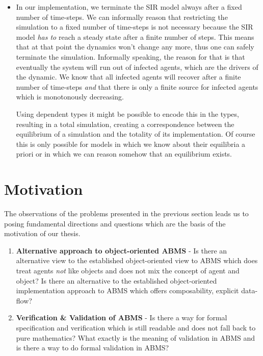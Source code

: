 \begin{itemize}
	\item In our implementation, we terminate the SIR model always after a fixed number of time-steps. We can informally reason that restricting the simulation to a fixed number of time-steps is not necessary because the SIR model \textit{has to} reach a steady state after a finite number of steps. This means that at that point the dynamics won't change any more, thus one can safely terminate the simulation. Informally speaking, the reason for that is that eventually the system will run out of infected agents, which are the drivers of the dynamic. We know that all infected agents will recover after a finite number of time-steps \textit{and} that there is only a finite source for infected agents which is monotonously decreasing. 
	
	Using dependent types it might be possible to encode this in the types, resulting in a total simulation, creating a correspondence between the equilibrium of a simulation and the totality of its implementation. Of course this is only possible for models in which we know about their equilibria a priori or in which we can reason somehow that an equilibrium exists.
\end{itemize}

\section{Motivation}
The observations of the problems presented in the previous section leads us to posing fundamental directions and questions which are the basis of the motivation of our thesis.

\begin{enumerate}
	\item \textbf{Alternative approach to object-oriented ABMS} - Is there an alternative view to the established object-oriented view to ABMS which does treat agents \textit{not} like objects and does not mix the concept of agent and object? Is there an alternative to the established object-oriented implementation approach to ABMS which offers composability, explicit data-flow?
	\item \textbf{Verification \& Validation of ABMS} - Is there a way for formal specification and verification which is still readable and does not fall back to pure mathematics? What exactly is the meaning of validation in ABMS and is there a way to do formal validation in ABMS? 
\end{enumerate}